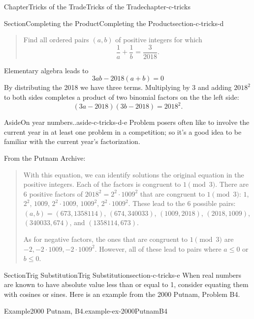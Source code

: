\documentclass[oneside,10pt,]{book}
\numberwithin{equation}{section}
\begin{document}
\begin{chapterptx}{Chapter}{Tricks of the Trade}{}{Tricks of the Trade}{}{}{chapter-c-tricks}
\begin{sectionptx}{Section}{Completing the Product}{}{Completing the Product}{}{}{section-c-tricks-d}
\begin{quote}%
Find all ordered pairs \((a,b)\) of positive integers for which%
\begin{equation*}
\frac{1}{a} + \frac{1}{b} = \frac{3}{2018}.
\end{equation*}
%
\end{quote}
Elementary algebra leads to%
\begin{equation*}
3ab-2018(a+b)=0
\end{equation*}
By distributing the 2018 we have three terms.  Multiplying by 3 and adding \(2018^2\) to both sides completes a product of two binomial factors on the the left side:%
\begin{equation*}
(3a-2018)(3b-2018) = 2018^2.
\end{equation*}
%
\begin{aside}{Aside}{On year numbers..}{aside-c-tricks-d-e}%
Problem posers often like to involve the current year in at least one problem in a competition; so it's a good idea to be familiar with the current year's factorization.%
\end{aside}
From the Putnam Archive:%
\begin{quote}%
With this equation, we can identify solutions the original equation in the positive integers. Each of the factors is congruent to \(1 \pmod 3\). There are \(6\) positive factors of \(2018^2 = 2^2 \cdot 1009^2\) that are congruent to \(1 \pmod 3\): \(1\), \(2^2\), \(1009\), \(2^2 \cdot 1009\), \(1009^2\), \(2^2 \cdot 1009^2\). These lead to the \(6\) possible pairs: \((a,b) = (673,1358114)\), \((674,340033)\), \((1009,2018)\), \((2018,1009)\), \((340033,674)\), and \((1358114,673)\).%
\par
As for negative factors, the ones that are congruent to \(1 \pmod 3\) are \(-2, -2 \cdot 1009, -2 \cdot 1009^2\).  However, all of these lead to pairs where \(a \leq 0\) or \(b \leq 0\).%
\end{quote}
\end{sectionptx}
%
%
\typeout{************************************************}
\typeout{************************************************}
%
\begin{sectionptx}{Section}{Trig Substitution}{}{Trig Substitution}{}{}{section-c-tricks-e}
When real numbers are known to have absolute value less than or equal to 1, consider equating them with cosines or sines.   Here is an example from the 2000 Putnam, Problem B4.%
\begin{example}{Example}{2000 Putnam, B4.}{example-ex-2000PutnamB4}%

\end{example}
\end{sectionptx}
\end{chapterptx}
\end{document}
